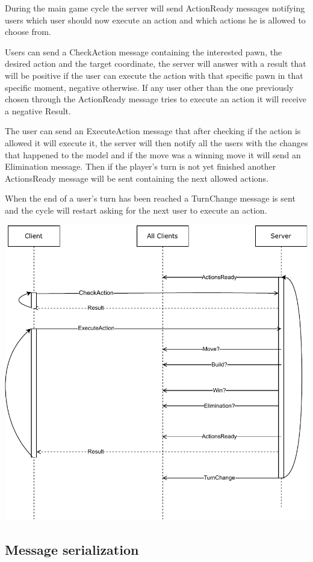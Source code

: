 \documentclass{article}
\begin{document}
During the main game cycle the server will send ActionReady messages notifying users which user should now execute an action and which actions he is allowed to choose from. 

Users can send a CheckAction message containing the interested pawn, the desired action and the target coordinate, the server will answer with a result that will be positive if the user can execute the action with that specific pawn in that specific moment, negative otherwise. If any user other than the one previously chosen through the ActionReady message tries to execute an action it will receive a negative Result.

The user can send an ExecuteAction message that after checking if the action is allowed it will execute it, the server will then notify all the users with the changes that happened to the model and if the move was a winning move it will send an Elimination message. Then if the player's turn is not yet finished another ActionsReady message will be sent containing the next allowed actions.

When the end of a user's turn has been reached a TurnChange message is sent and the cycle will restart asking for the next user to execute an action.

\vspace{8pt}
\includegraphics[width=0.85\linewidth]{communication_uml_3.pdf}

\subsection*{Message serialization}
\end{document}

